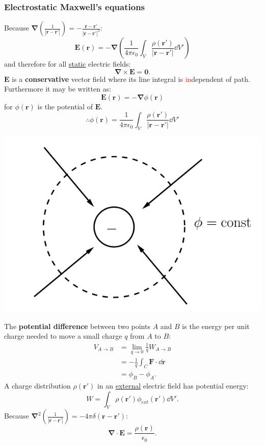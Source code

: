 \documentclass{article}
\newcommand{\vc}[1]{\boldsymbol{#1}}
\begin{document}
\begin{multicols*}{3}
\subsubsection*{Electrostatic Maxwell's equations}
Because $\displaystyle\vc{\nabla}\left(
\frac{1}{|\vc{r}-\vc{r}'|}\right)
=-\frac{\vc{r}-\vc{r}'}{|\vc{r}-\vc{r}'|^3}$:
$$\vc{E}(\vc{r})=-\vc{\nabla}
\left(\frac{1}{4\pi\epsilon_0}
\int_V\frac{\rho(\vc{r}')}{|\vc{r}-\vc{r}'|}\dd V'\right)$$
and therefore for all \underline{static} electric fields:
$$\vc{\nabla}\times\vc{E}=\vc{0}.$$
$\vc{E}$ is a \textbf{conservative} vector field
where its line integral is \textcolor{red}{in}dependent of path.
Furthermore it may be written as:
$$\vc{E}(\vc{r})=-\vc{\nabla}\phi(\vc{r})$$
for $\phi(\vc{r})$ is the potential of $\vc{E}$.
$$\therefore\phi(\vc{r})=\frac{1}{4\pi\epsilon_0}
\int_V\frac{\rho(\vc{r}')}{|\vc{r}-\vc{r}'|}\dd V'$$
\begin{center}
    \includegraphics[scale=0.3]{f1.png}
\end{center}
The \textbf{potential difference} between
two points $A$ and $B$ is the energy per unit charge
needed to move a small charge $q$ from $A$ to $B$:
\begin{align*}
    V_{A\rightarrow B}
    &=\lim_{q\rightarrow0}\frac{1}{q}W_{A\rightarrow B} \\
    &=-\frac{1}{q}\int_C\vc{F}\cdot\dd\vc{r} \\
    &=\phi_B-\phi_A.
\end{align*}
A charge distribution $\rho(\vc{r}')$ in an \underline{external}
electric field has potential energy:
$$W=\int_V\rho(\vc{r}')\phi_{ext}(\vc{r}')\dd V'.$$
Because $\displaystyle\vc{\nabla}^2\left(
\frac{1}{|\vc{r}-\vc{r}'|}\right)=-4\pi\delta(\vc{\vc{r}-\vc{r}'})$:
$$\vc{\nabla}\cdot\vc{E}=\frac{\rho(\vc{r})}{\epsilon_0}.$$


\end{multicols*}
\end{document}
